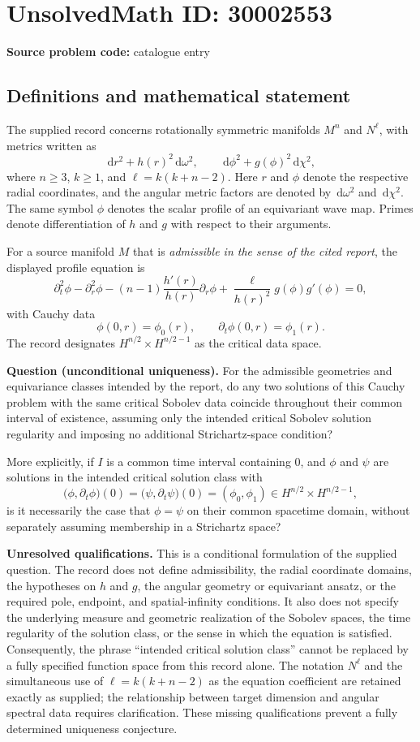 \documentclass[11pt]{article}
\newcommand{\dd}{\,\mathrm{d}}
\begin{document}
\section*{UnsolvedMath ID: 30002553}
\textbf{Source problem code:} catalogue entry
\subsection{Definitions and mathematical statement}
The supplied record concerns rotationally symmetric manifolds \(M^n\) and \(N^\ell\), with metrics written as
\[
\dd r^2+h(r)^2\dd\omega^2,
\qquad
\dd\phi^2+g(\phi)^2\dd\chi^2,
\]
where \(n\geq 3\), \(k\geq 1\), and \(\ell=k(k+n-2)\). Here \(r\) and \(\phi\) denote the respective radial coordinates, and the angular metric factors are denoted by \(\dd\omega^2\) and \(\dd\chi^2\). The same symbol \(\phi\) denotes the scalar profile of an equivariant wave map. Primes denote differentiation of \(h\) and \(g\) with respect to their arguments.

For a source manifold \(M\) that is \emph{admissible in the sense of the cited report}, the displayed profile equation is
\[
\partial_t^2\phi-\partial_r^2\phi
-(n-1)\frac{h'(r)}{h(r)}\partial_r\phi
+\frac{\ell}{h(r)^2}g(\phi)g'(\phi)=0,
\]
with Cauchy data
\[
\phi(0,r)=\phi_0(r),\qquad
\partial_t\phi(0,r)=\phi_1(r).
\]
The record designates \(H^{n/2}\times H^{n/2-1}\) as the critical data space.

\textbf{Question (unconditional uniqueness).} For the admissible geometries and equivariance classes intended by the report, do any two solutions of this Cauchy problem with the same critical Sobolev data coincide throughout their common interval of existence, assuming only the intended critical Sobolev solution regularity and imposing no additional Strichartz-space condition?

More explicitly, if \(I\) is a common time interval containing \(0\), and \(\phi\) and \(\psi\) are solutions in the intended critical solution class with
\[
\bigl(\phi,\partial_t\phi\bigr)(0)
=
\bigl(\psi,\partial_t\psi\bigr)(0)
=(\phi_0,\phi_1)
\in H^{n/2}\times H^{n/2-1},
\]
is it necessarily the case that \(\phi=\psi\) on their common spacetime domain, without separately assuming membership in a Strichartz space?

\textbf{Unresolved qualifications.} This is a conditional formulation of the supplied question. The record does not define admissibility, the radial coordinate domains, the hypotheses on \(h\) and \(g\), the angular geometry or equivariant ansatz, or the required pole, endpoint, and spatial-infinity conditions. It also does not specify the underlying measure and geometric realization of the Sobolev spaces, the time regularity of the solution class, or the sense in which the equation is satisfied. Consequently, the phrase ``intended critical solution class'' cannot be replaced by a fully specified function space from this record alone. The notation \(N^\ell\) and the simultaneous use of \(\ell=k(k+n-2)\) as the equation coefficient are retained exactly as supplied; the relationship between target dimension and angular spectral data requires clarification. These missing qualifications prevent a fully determined uniqueness conjecture.
\end{document}
